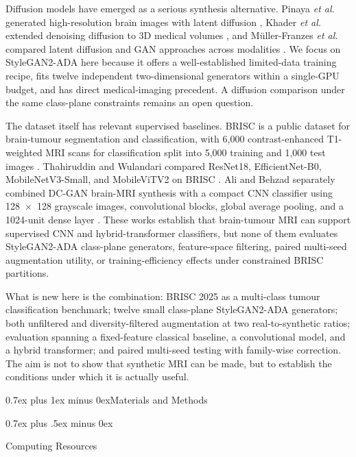 \documentclass[conference,twoside]{IEEEtran}
\makeatletter
\newcommand{\bodyfont}{\rmfamily}
\newcommand{\figfont}{\sffamily}
\def\section{\@startsection{section}{1}{\z@}{1.5ex plus 1.5ex minus 0.5ex}%
{0.7ex plus 1ex minus 0ex}{\normalfont\normalsize\figfont\scshape\bfseries\centering}}
\def\subsection{\@startsection{subsection}{2}{\z@}{1.5ex plus 1.5ex minus 0.5ex}%
{0.7ex plus .5ex minus 0ex}{\normalfont\normalsize\bodyfont\bfseries\raggedright}}
\makeatother
\begin{document}
Diffusion models have emerged as a serious synthesis alternative. Pinaya \textit{et al.} generated high-resolution brain images with latent diffusion \cite{pinaya2022brainldm}, Khader \textit{et al.} extended denoising diffusion to 3D medical volumes \cite{khader2023ddpmmedical}, and M{\"u}ller-Franzes \textit{et al.} compared latent diffusion and GAN approaches across modalities \cite{mullerfranzes2023multimodal}. We focus on StyleGAN2-ADA here because it offers a well-established limited-data training recipe, fits twelve independent two-dimensional generators within a single-GPU budget, and has direct medical-imaging precedent. A diffusion comparison under the same class-plane constraints remains an open question.

The dataset itself has relevant supervised baselines. BRISC is a public dataset for brain-tumour segmentation and classification, with 6,000 contrast-enhanced T1-weighted MRI scans for classification split into 5,000 training and 1,000 test images \cite{fateh2026brisc}. Thahiruddin and Wulandari compared ResNet18, EfficientNet-B0, MobileNetV3-Small, and MobileViTV2 on BRISC \cite{thahiruddin2025brisc}. Ali and Behzad separately combined DC-GAN brain-MRI synthesis with a compact CNN classifier using 128~$\times$~128 grayscale images, convolutional blocks, global average pooling, and a 1024-unit dense layer \cite{ali2025dcgancnn}. These works establish that brain-tumour MRI can support supervised CNN and hybrid-transformer classifiers, but none of them evaluates StyleGAN2-ADA class-plane generators, feature-space filtering, paired multi-seed augmentation utility, or training-efficiency effects under constrained BRISC partitions.

What is new here is the combination: BRISC 2025 as a multi-class tumour classification benchmark; twelve small class-plane StyleGAN2-ADA generators; both unfiltered and diversity-filtered augmentation at two real-to-synthetic ratios; evaluation spanning a fixed-feature classical baseline, a convolutional model, and a hybrid transformer; and paired multi-seed testing with family-wise correction. The aim is not to show that synthetic MRI can be made, but to establish the conditions under which it is actually useful.

\section{Materials and Methods}

\subsection{Computing Resources}
\end{document}
